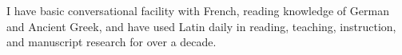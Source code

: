 I have basic conversational facility with French, reading knowledge of German and Ancient Greek, and have used Latin daily in reading, teaching, instruction, and manuscript research for over a decade.
